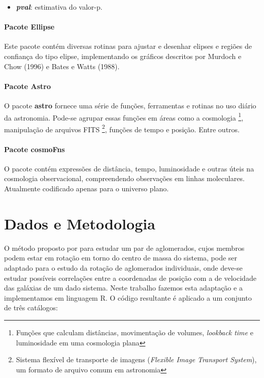 \begin{itemize}
   \item \textit{\textbf{pval}}: estimativa do valor-p.
 \end{itemize} 

\subsubsection{Pacote Ellipse}

Este pacote contém diversas rotinas para ajustar e desenhar elipses e regiões de confiança do tipo elipse, implementando os gráficos descritos por Murdoch e Chow (1996) e Bates e Watts (1988).

\subsubsection{Pacote Astro}

O pacote \textbf{astro} fornece uma série de funções, ferramentas e rotinas no uso diário da astronomia. Pode-se agrupar essas funções em áreas como a cosmologia \footnote{Funções que calculam distâncias, movimentação de volumes, \textit{lookback time} e luminosidade em uma cosmologia plana}, manipulação de arquivos FITS \footnote{Sistema flexível de transporte de imagens (\textit{Flexible Image Transport System}), um formato de arquivo comum em astronomia}, funções de tempo e posição. Entre outros.

\subsubsection{Pacote cosmoFns}
 O pacote contém expressões de distância, tempo, luminosidade e outras úteis na cosmologia observacional, compreendendo observações em linhas moleculares. Atualmente codificado apenas para o universo plano.

\chapter{Dados e Metodologia}

O método proposto por  para estudar um par de aglomerados, cujos membros podem estar em rotação em torno
do centro de massa do sistema, pode ser adaptado para o estudo da rotação de aglomerados individuais, onde deve-se estudar
possíveis correlações entre a coordenadas de posição com a de velocidade das galáxias de um dado sistema. Neste trabalho fazemos esta adaptação e a implementamos em linguagem R. O código resultante é aplicado a um conjunto de três catálogos: 

